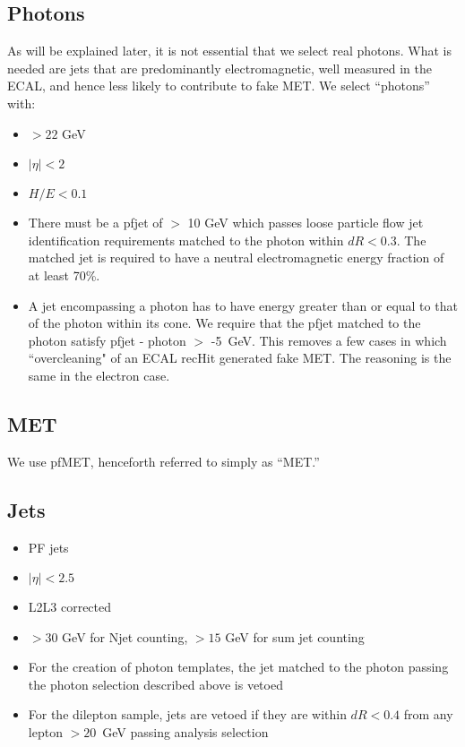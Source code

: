 \subsection{Photons}

As will be explained later, it is not essential that we select real photons. 
What is needed are jets that are predominantly electromagnetic, well measured in the ECAL, and hence less likely to contribute to fake MET. We select ``photons'' with:

\begin{itemize}
\item \pt $ > 22$ GeV
\item $|\eta| < 2$
\item $H/E < 0.1$
\item There must be a pfjet of \pt $ >$ 10 GeV which passes loose particle flow jet identification requirements matched to the photon within $dR < 0.3$. The matched jet is required to have a neutral electromagnetic energy fraction of at least 70\%.
\item A jet encompassing a photon has to have energy greater than or equal to that of the photon within its cone. We require that the pfjet \pt matched to the photon satisfy pfjet \pt - photon \pt $>$ -5~GeV. This removes a few cases in which ``overcleaning" of an ECAL recHit generated fake MET. The reasoning is the same in the electron case.

\end{itemize}

\subsection{MET}

We use pfMET, henceforth referred to simply as ``MET.''

\subsection{Jets}

\begin{itemize}
\item PF jets
\item $|\eta| < 2.5$
\item L2L3 corrected
\item \pt $ > 30$ GeV for Njet counting, \pt $ > 15$ GeV for sum jet \pt counting
\item For the creation of photon templates, the jet matched to the photon passing the photon selection described above is vetoed
\item For the dilepton sample, jets are vetoed if they are within $dR < 0.4$ from any lepton \pt $ > 20$~GeV passing analysis selection
\end{itemize}

